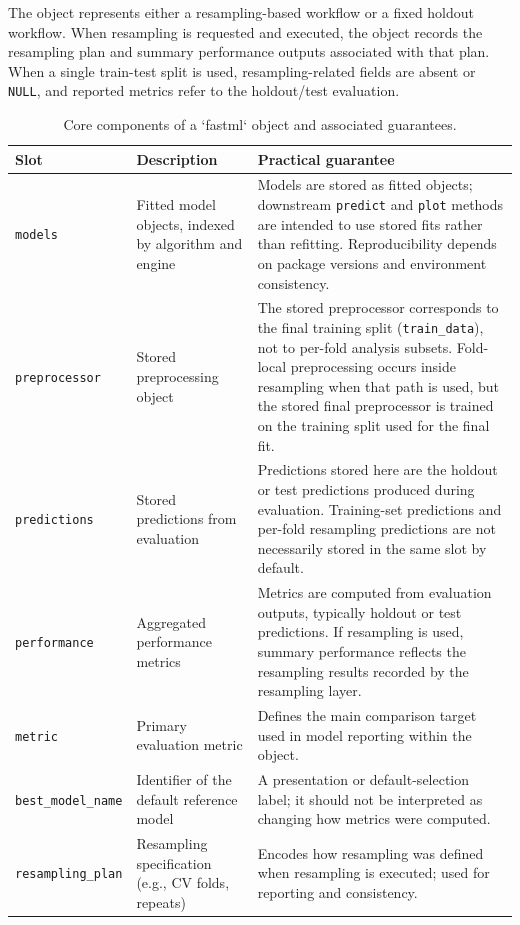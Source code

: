 The object represents either a resampling-based workflow or a fixed holdout workflow. When resampling is requested and executed, the object records the resampling plan and summary performance outputs associated with that plan. When a single train-test split is used, resampling-related fields are absent or \texttt{NULL}, and reported metrics refer to the holdout/test evaluation.

\begin{table}

\caption{\label{tab:fastml-object-table}Core components of a `fastml` object and associated guarantees.}
\centering
\begin{tabular}[t]{lll}
\toprule
Slot & Description & Practical guarantee\\
\midrule
\texttt{models} & Fitted model objects, indexed by algorithm and engine & Models are stored as fitted objects; downstream \texttt{predict} and \texttt{plot} methods are intended to use stored fits rather than refitting. Reproducibility depends on package versions and environment consistency.\\
\texttt{preprocessor} & Stored preprocessing object & The stored preprocessor corresponds to the final training split (\texttt{train\_data}), not to per-fold analysis subsets. Fold-local preprocessing occurs inside resampling when that path is used, but the stored final preprocessor is trained on the training split used for the final fit.\\
\texttt{predictions} & Stored predictions from evaluation & Predictions stored here are the holdout or test predictions produced during evaluation. Training-set predictions and per-fold resampling predictions are not necessarily stored in the same slot by default.\\
\texttt{performance} & Aggregated performance metrics & Metrics are computed from evaluation outputs, typically holdout or test predictions. If resampling is used, summary performance reflects the resampling results recorded by the resampling layer.\\
\texttt{metric} & Primary evaluation metric & Defines the main comparison target used in model reporting within the object.\\
\addlinespace
\texttt{best\_model\_name} & Identifier of the default reference model & A presentation or default-selection label; it should not be interpreted as changing how metrics were computed.\\
\texttt{resampling\_plan} & Resampling specification (e.g., CV folds, repeats) & Encodes how resampling was defined when resampling is executed; used for reporting and consistency.\\

\end{tabular}
\end{table}
